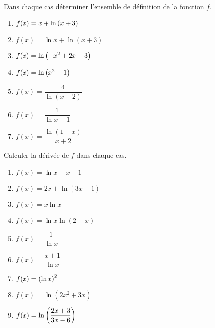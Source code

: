   \begin{exercice}
Dans chaque cas déterminer l'ensemble de définition de la fonction $ f. $

\begin{enumerate}
\item  $ f(x)=x+\ln \left(x +3\right) $ 
\item  $ f(x)=\ln x+\ln(x +3) $ 
\item $ f(x)=\ln \left(-x^{2}+2x +3\right) $  
\item  $ f(x)=\ln \left(x^{2} -1\right) $                                                   
\item $ f(x)=\dfrac{4}{\ln (x-2)} $ 
\item $ f(x)=\dfrac{1}{\ln x-1}$
\item $ f(x)= \dfrac{\ln (1-x)}{x+2} $

\end{enumerate}

  \end{exercice}
 
  \begin{exercice}
 Calculer la dérivée de  $ f $  dans chaque cas.

\begin{enumerate}
\item $ f(x)=\ln x-x-1 $ 
\item $ f(x)=2x+\ln (3x-1)$  
\item $f(x)= x\ln x $  
\item  $f(x)= \ln x\ln(2-x)  $  
 \item $ f(x)= \dfrac{1}{\ln x}$ 
  \item $ f(x)= \dfrac{x+1}{\ln x}$
   \item $ f(x)= \left(\ln x\right)^{2}$ 
   \item  $f(x)= \ln(2x^{2}+3x)  $  
   \item $ f(x)=\ln \left(\dfrac{2x+3}{3x-6}\right) $
   
\end{enumerate}

 \end{exercice}

